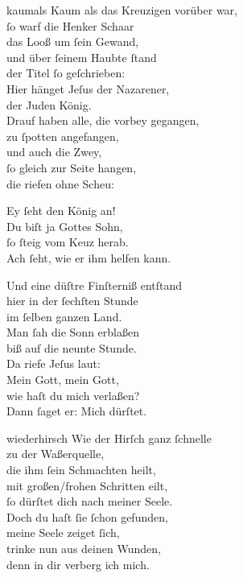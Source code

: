\documentclass[shorttitlesize=55,tocstyle=ref-genre]{ees}
\begin{document}
{\begin{movement}{kaumals}
  \voice[Evangelium]
  Kaum als das Kreuzigen vorüber war,\\
  ſo warf die Henker Schaar\\
  das Looß um ſein Gewand,\\
  und über ſeinem Haubte ſtand\\
  der Titel ſo geſchrieben:\\
  Hier hänget Jeſus der Nazarener,\\
  der Juden König.\\
  Drauf haben alle, die vorbey gegangen,\\
  zu ſpotten angefangen,\\
  und auch die Zwey,\\
  ſo gleich zur Seite hangen,\\
  die riefen ohne Scheu:

  \voice[Chor]
  Ey ſeht den König an!\\
  Du biſt ja Gottes Sohn,\\
  ſo ſteig vom Keuz herab.\\
  Ach ſeht, wie er ihm helfen kann.

  \voice[Evangelium]
  Und eine düſtre Finſterniß entſtand\\
  hier in der ſechſten Stunde\\
  im ſelben ganzen Land.\\
  Man ſah die Sonn erblaßen\\
  biß auf die neunte Stunde.\\
  Da riefe Jeſus laut:\\
  Mein Gott, mein Gott,\\
  wie haſt du mich verlaßen?\\
  Dann ſaget er: Mich dürſtet.
\end{movement}

\begin{movement}{wiederhirsch}
  Wie der Hirſch ganz ſchnelle\\
  zu der Waßerquelle,\\
  die ihm ſein Schmachten heilt,\\
  mit großen/frohen Schritten eilt,\\
  ſo dürſtet dich nach meiner Seele.\\
  Doch du haſt ſie ſchon gefunden,\\
  meine Seele zeiget ſich,\\
  trinke nun aus deinen Wunden,\\
  denn in dir verberg ich mich.
\end{movement}

}
\end{document}
